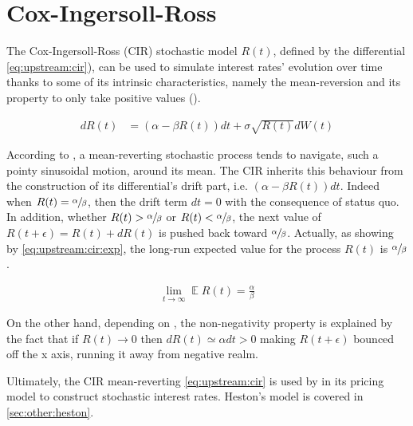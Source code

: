 \documentclass[12pt,a4paper]{report}
\begin{document}
\section{Cox-Ingersoll-Ross}
\label{sec:CoxIngersollRoss}

The Cox-Ingersoll-Ross (CIR) stochastic model $R(t)$, defined by the differential \cref{eq:upstream:cir}), can be used to simulate interest rates' evolution over time thanks to some of its intrinsic characteristics, namely the mean-reversion and its property to only take positive values (\citet{shreve}).

\begin{align}
dR(t) &= (\alpha - \beta R(t)) dt + \sigma \sqrt{R(t)} dW(t)
\label{eq:upstream:cir}
\end{align}

According to \citet{shreve}, a  mean-reverting stochastic process tends to navigate, such a pointy sinusoidal motion, around its mean.
The CIR inherits this behaviour from the construction of its differential's drift part, i.e. $(\alpha - \beta R(t))dt$.
Indeed when $R(t) = \sfrac{\alpha}{\beta}$, then the drift term $dt = 0$ with the consequence of status quo.
In addition, whether $R(t) > \sfrac{\alpha}{\beta}$ or $R(t) < \sfrac{\alpha}{\beta}$, the next value of $R(t + \epsilon) = R(t) + dR(t)$ is pushed back toward $\sfrac{\alpha}{\beta}$.
Actually, as showing by \cref{eq:upstream:cir:exp}, the long-run expected value for the process $R(t)$ is $\sfrac{\alpha}{\beta}$.

\begin{align}
\lim_{t \to \infty}  \mathop{\mathbb{E}} R(t) = \frac{\alpha}{\beta} \label{eq:upstream:cir:exp}
\end{align}

On the other hand, depending on \citet{shreve}, the non-negativity property is explained by the fact that if $R(t) \to 0$ then $dR(t) \simeq \alpha dt > 0$ making $R(t+\epsilon)$ bounced off the x axis, running it away from negative realm.

Ultimately, the CIR mean-reverting \cref{eq:upstream:cir} is used by \citet{heston1993} in its pricing model to construct stochastic interest rates.
Heston's model is covered in \cref{sec:other:heston}.



\end{document}
